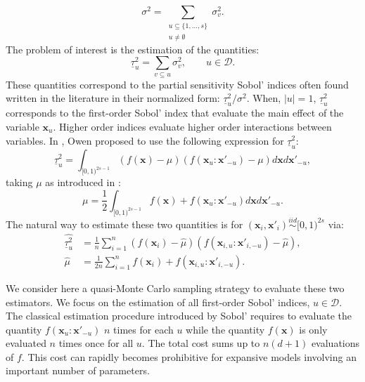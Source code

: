 \documentclass[]{elsarticle}
\theoremstyle{definition}
\newcommand{\bvec}[1]{\boldsymbol{#1}}
\newcommand{\vx}{\bvec{x}}
\begin{document}
\[ \sigma^2 = \sum_{\substack{u \subseteq \{1,\dots,s\} \\ u \neq \emptyset}} \sigma_v^2.\]
The problem of interest is the estimation of the quantities:
\[\underline{\tau}_u^2 = \sum \limits_{v \subseteq u} \sigma_v^2, \qquad u \in \mathcal{D}.\]
These quantities correspond to the partial sensitivity Sobol' indices \cite{sobol} often found written in the literature in their normalized form: $\underline{\tau}_u^2/\sigma^2$. When, $|u|=1$, $\underline{\tau}_u^2$ corresponds to the first-order Sobol' index that evaluate the main effect of the variable $\vx_u$. Higher order indices evaluate higher order interactions between variables. In \cite{owen}, Owen proposed to use the following expression for $\underline{\tau}_u^2$:
\begin{equation}\label{first_order_indice}
\underline{\tau}_u^2  =\int_{[0,1)^{2s-1}}(f(\vx) - \mu) (f(\vx_u:{\vx'}_{-u})-\mu) d\vx d{\vx'}_{-u},
\end{equation}
taking $\mu$ as introduced in \cite{monod,janon}:
\[\mu= \frac{1}{2} \int_{[0,1)^{2s-1}}f(\vx)+f(\vx_u:{\vx'}_{-u}) d\vx d{\vx'}_{-u}. \]
The natural way to estimate these two quantities is for $(\vx_i,\vx'_i) \stackrel{iid}{\sim} [0,1)^{2s}$ via:
\begin{align}
\widehat{\underline{\tau}_u^2} & = \frac{1}{n} \sum \limits_{i=1}^n (f(\vx_i) - \widehat{\mu}) (f(\vx_{i,u}:{\vx'}_{i,-u})-\widehat{\mu}),\label{first_order_indice_estimator}\\
\nonumber
\widehat{\mu} & = \frac{1}{2n} \sum \limits_{i=1}^n f(\vx_i) +f(\vx_{i,u}:{\vx'}_{i,-u}).
\end{align}

We consider here a quasi-Monte Carlo sampling strategy to evaluate these two estimators. We focus on the estimation of all first-order Sobol' indices, $u \in \mathcal{D}$. The classical estimation procedure introduced by Sobol' requires to evaluate the quantity $f(\vx_u:{\vx'}_{-u})$ $n$ times for each $u$ while the quantity $f(\vx)$ is only evaluated $n$ times once for all $u$. The total cost sums up to $n(d+1)$ evaluations of $f$. This cost can rapidly becomes prohibitive for expansive models involving an important number of parameters. 
\end{document}
